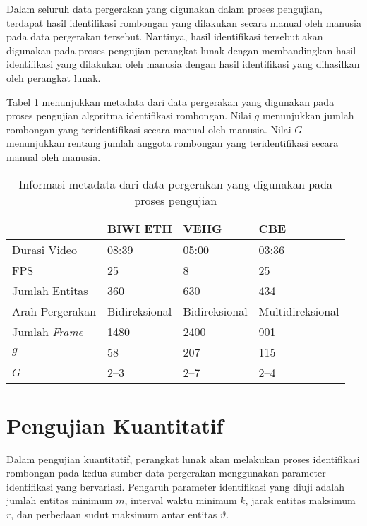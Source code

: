 Dalam seluruh data pergerakan yang digunakan dalam proses pengujian, terdapat hasil identifikasi rombongan yang dilakukan secara manual oleh manusia pada data pergerakan tersebut. Nantinya, hasil identifikasi tersebut akan digunakan pada proses pengujian perangkat lunak dengan membandingkan hasil identifikasi yang dilakukan oleh manusia dengan hasil identifikasi yang dihasilkan oleh perangkat lunak.

Tabel \ref{bab6:metadata-pergerakan} menunjukkan metadata dari data pergerakan yang digunakan pada proses pengujian algoritma identifikasi rombongan. Nilai $g$ menunjukkan jumlah rombongan yang teridentifikasi secara manual oleh manusia. Nilai $G$ menunjukkan rentang jumlah anggota rombongan yang teridentifikasi secara manual oleh manusia.

\begin{table}[t]
    \centering
    \begin{tabular}{p{3cm} p{2.5cm} p{2.5cm} p{3cm}}
        \hline
        & \textbf{BIWI ETH} & \textbf{VEIIG} & \textbf{CBE} \\
        \hline
        Durasi Video & 08:39 & 05:00 & 03:36 \\
        FPS & 25 & 8 & 25 \\
        Jumlah Entitas & 360 & 630 & 434 \\
        Arah Pergerakan & Bidireksional & Bidireksional & Multidireksional \\
        Jumlah \textit{Frame} & 1480 & 2400 & 901 \\
        $g$ & 58 & 207 & 115 \\
        $G$ & 2--3 & 2--7 & 2--4 \\
        \hline
    \end{tabular}
    \caption[Metadata sumber data pergerakan]{Informasi metadata dari data pergerakan yang digunakan pada proses pengujian}
    \label{bab6:metadata-pergerakan}
\end{table}

\section{Pengujian Kuantitatif}
\label{sec:quantitative}

Dalam pengujian kuantitatif, perangkat lunak akan melakukan proses identifikasi rombongan pada kedua sumber data pergerakan menggunakan parameter identifikasi yang bervariasi. Pengaruh parameter identifikasi yang diuji adalah jumlah entitas minimum $m$, interval waktu minimum $k$, jarak entitas maksimum $r$, dan perbedaan sudut maksimum antar entitas $\vartheta$. 

